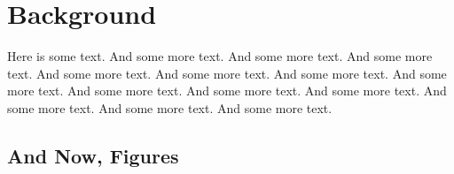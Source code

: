\chapter{Background}
\label{chp:Background}

Here is some text. And some more text. And some more text. And some more text. And some more text. And some more text. And some more text. And some more text. And some more text. And some more text. And some more text. And some more text. And some more text. And some more text.

\section{And Now, Figures}
\label{sec:figures}

